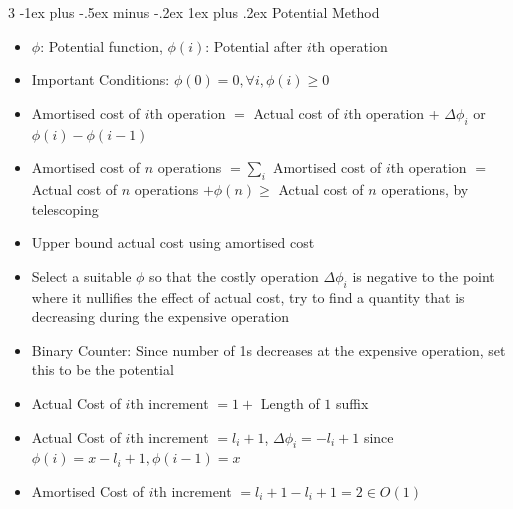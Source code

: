 \documentclass[10pt, landscape]{article}
\makeatletter
\renewcommand{\subsection}{\@startsection{subsection}{3}{0mm}%
                                {-1ex plus -.5ex minus -.2ex}%
                                {1ex plus .2ex}%
                                {\normalfont\small\bfseries}}%
\makeatother
\begin{document}
\begin{multicols*}{3}
\subsection{Potential Method}
\begin{itemize}
    \item $\phi$: Potential function, $\phi(i)$: Potential after $i$th operation
    \item Important Conditions: $\phi(0)=0, \forall i, \phi(i)\geq0$
    \item Amortised cost of $i$th operation $=$ Actual cost of $i$th operation + $\Delta\phi_i$ or $\phi(i)-\phi(i-1)$
    \item Amortised cost of $n$ operations $=\sum_i$ Amortised cost of $i$th operation $=$ Actual cost of $n$ operations $+\phi(n)\geq$ Actual cost of $n$ operations, by telescoping
    \item Upper bound actual cost using amortised cost
    \item Select a suitable $\phi$ so that the costly operation $\Delta\phi_i$ is negative to the point where it nullifies the effect of actual cost, try to find a quantity that is decreasing during the expensive operation
    \item Binary Counter: Since number of 1s decreases at the expensive operation, set this to be the potential
    \item Actual Cost of $i$th increment $=1+$ Length of $1$ suffix
    \item Actual Cost of $i$th increment $=l_i+1$, $\Delta\phi_i=-l_i+1$ since $\phi(i)=x-l_i+1, \phi(i-1)=x$
    \item Amortised Cost of $i$th increment $=l_i+1-l_i+1=2 \in O(1)$
\end{itemize}


\end{multicols*}
\end{document}
